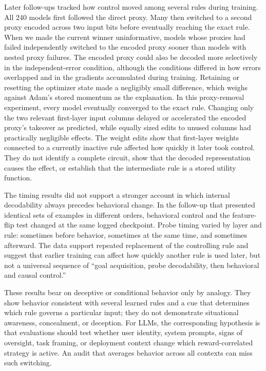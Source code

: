 \documentclass[11pt,a4paper]{article}
\begin{document}
Later follow-ups tracked how control moved among several rules during training. All 240 models first followed the direct proxy. Many then switched to a second proxy encoded across two input bits before eventually reaching the exact rule. When we made the current winner uninformative, models whose proxies had failed independently switched to the encoded proxy sooner than models with nested proxy failures. The encoded proxy could also be decoded more selectively in the independent-error condition, although the conditions differed in how errors overlapped and in the gradients accumulated during training. Retaining or resetting the optimizer state made a negligibly small difference, which weighs against Adam's stored momentum as the explanation. In this proxy-removal experiment, every model eventually converged to the exact rule. Changing only the two relevant first-layer input columns delayed or accelerated the encoded proxy's takeover as predicted, while equally sized edits to unused columns had practically negligible effects. The weight edits show that first-layer weights connected to a currently inactive rule affected how quickly it later took control. They do not identify a complete circuit, show that the decoded representation causes the effect, or establish that the intermediate rule is a stored utility function.

The timing results did not support a stronger account in which internal decodability always precedes behavioral change. In the follow-up that presented identical sets of examples in different orders, behavioral control and the feature-flip test changed at the same logged checkpoint. Probe timing varied by layer and rule: sometimes before behavior, sometimes at the same time, and sometimes afterward. The data support repeated replacement of the controlling rule and suggest that earlier training can affect how quickly another rule is used later, but not a universal sequence of ``goal acquisition, probe decodability, then behavioral and causal control.''

These results bear on deceptive or conditional behavior only by analogy. They show behavior consistent with several learned rules and a cue that determines which rule governs a particular input; they do not demonstrate situational awareness, concealment, or deception. For LLMs, the corresponding hypothesis is that evaluations should test whether user identity, system prompts, signs of oversight, task framing, or deployment context change which reward-correlated strategy is active. An audit that averages behavior across all contexts can miss such switching.
\end{document}
